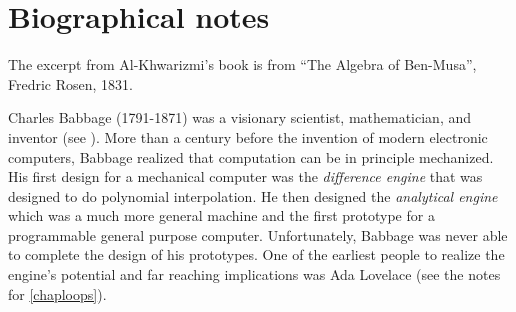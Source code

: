 \hypertarget{majwithNAND}{}

\hypertarget{outputlastlayer}{}

\section{Biographical notes}\label{Biographical-notes}

The excerpt from Al-Khwarizmi's book is from ``The Algebra of
Ben-Musa'', Fredric Rosen, 1831.

Charles Babbage (1791-1871) was a visionary scientist, mathematician,
and inventor (see \cite{swade2002the, collier2000charles}). More than a
century before the invention of modern electronic computers, Babbage
realized that computation can be in principle mechanized. His first
design for a mechanical computer was the \emph{difference engine} that
was designed to do polynomial interpolation. He then designed the
\emph{analytical engine} which was a much more general machine and the
first prototype for a programmable general purpose computer.
Unfortunately, Babbage was never able to complete the design of his
prototypes. One of the earliest people to realize the engine's potential
and far reaching implications was Ada Lovelace (see the notes for
\cref{chaploops}).

